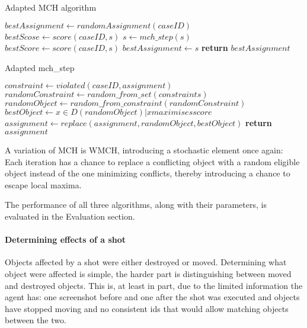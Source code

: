 \begin{algorithm}
    \caption{Adapted MCH algorithm}\label{alog:mch}
    \begin{algorithmic}[1]
        \State $bestAssignment\gets randomAssignment(caseID)$
        \State $bestScose \gets score(caseID, s)$
        \State $s\gets mch\_step(s)$
        \State $bestScore\gets score(caseID, s)$
        \State $bestAssignment\gets s$
        \EndIf
        \EndWhile\label{euclidendwhile}
        \State \textbf{return} $bestAssignment$
        \EndProcedure
    \end{algorithmic}
\end{algorithm}


\begin{algorithm}
    \caption{Adapted mch\_step}\label{algo:mch_step}
    \begin{algorithmic}[1]
        \State $constraint \gets violated(caseID, assignment)$
        \State $randomConstraint\gets random\_from\_set(constraints)$
        \State $randomObject \gets random\_from\_constraint(randomConstraint)$
        \State $bestObject \gets {x \in D(randomObject) \vert x maximises score}$
        \State $assignment \gets replace(assignment, randomObject, bestObject)$
        \State \textbf{return} $assignment$
        \EndProcedure
    \end{algorithmic}
\end{algorithm}

A variation of MCH is WMCH, introducing a stochastic element once again: Each iteration has a chance to replace a conflicting object with a random eligible object instead of the one minimizing conflicts, thereby introducing a chance to escape local maxima.\cite{KapKis}

The performance of all three algorithms, along with their parameters, is evaluated in the Evaluation section.

\paragraph{Determining effects of a shot}
Objects affected by a shot were either destroyed or moved. Determining what object were affected is simple, the harder part is distinguishing between moved and destroyed objects. This is, at least in part, due to the limited information the agent has: one screenshot before and one after the shot was executed and objects have stopped moving and no consistent ids that would allow matching objects between the two.

